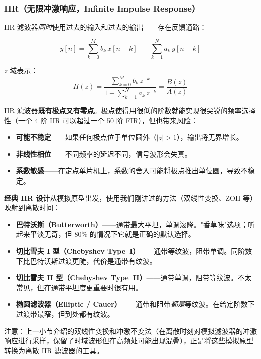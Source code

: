 \subsubsection{IIR（无限冲激响应，Infinite Impulse Response）}

IIR 滤波器\textit{同时}使用过去的输入和过去的输出——存在反馈通路：

\begin{equation}
y[n] = \sum_{k=0}^{M} b_k \, x[n-k] \;-\; \sum_{k=1}^{N} a_k \, y[n-k]
\end{equation}

$z$ 域表示：
\begin{equation}
H(z) = \frac{\displaystyle\sum_{k=0}^{M} b_k \, z^{-k}}
            {1 + \displaystyle\sum_{k=1}^{N} a_k \, z^{-k}}
     = \frac{B(z)}{A(z)}
\end{equation}

IIR 滤波器\textbf{既有极点又有零点}。极点使得用很低的阶数就能实现很尖锐的频率选择性（一个 4 阶 IIR 可以超过一个 50 阶 FIR），但也带来风险：
\begin{itemize}
    \item \textbf{可能不稳定}——如果任何极点位于单位圆外（$|z| > 1$），输出将无界增长。
    \item \textbf{非线性相位}——不同频率的延迟不同，信号波形会失真。
    \item \textbf{系数敏感}——在定点单片机上，系数的舍入可能将极点推出单位圆，导致不稳定。
\end{itemize}

\textbf{经典 IIR 设计}从模拟原型出发，使用我们刚讲过的方法（双线性变换、ZOH 等）映射到离散时间：
\begin{itemize}
    \item \textbf{巴特沃斯（Butterworth）}——通带最大平坦，单调滚降。"香草味"选项；听起来平淡无奇，但 80\% 的情况下它就是正确的默认选择。
    \item \textbf{切比雪夫 I 型（Chebyshev Type~I）}——通带等纹波，阻带单调。同阶数下比巴特沃斯过渡更陡，代价是通带有纹波。
    \item \textbf{切比雪夫 II 型（Chebyshev Type~II）}——通带单调，阻带等纹波。不太常见，但在通带平坦度更重要时很有用。
    \item \textbf{椭圆滤波器（Elliptic / Cauer）}——通带和阻带\textit{都是}等纹波。在给定阶数下过渡带最窄，但到处都有纹波。
\end{itemize}

注意：上一小节介绍的双线性变换和冲激不变法（在离散时刻对模拟滤波器的冲激响应进行采样，保留了时域波形但在高频处可能出现混叠），正是将这些模拟原型转换为离散 IIR 滤波器的工具。

